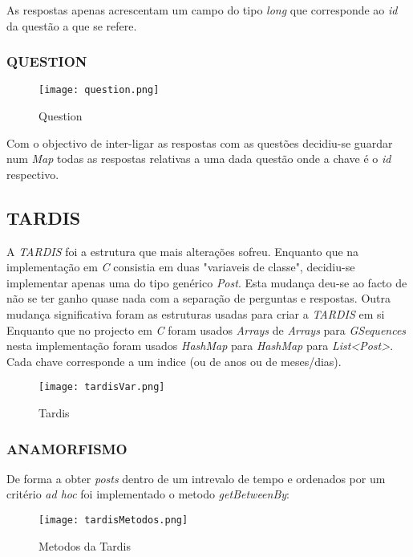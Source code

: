 \documentclass[letterpaper, 10 pt, conference]{IEEEtran} %
\begin{document}
As respostas apenas acrescentam um campo do tipo \textit{long} que corresponde ao \textit{id} da questão a que se refere.

\subsubsection{QUESTION}
\begin{figure}[h!]
  \centering
  \texttt{[image: question.png]}
   \caption{Question}
\end{figure}

Com o objectivo de inter-ligar as respostas com as questões decidiu-se guardar num \textit{Map} todas as respostas relativas a uma dada questão onde a chave é o \textit{id} respectivo.

\subsection{TARDIS}

A \textit{TARDIS} foi a estrutura que mais alterações sofreu.
Enquanto que na implementação em \textit{C} consistia em duas "variaveis de classe", decidiu-se implementar apenas uma do tipo genérico \textit{Post}. Esta mudança deu-se ao facto de não se ter ganho quase nada com a separação de perguntas e respostas.
Outra mudança significativa foram as estruturas usadas para criar a \textit{TARDIS} em si Enquanto que no projecto em \textit{C} foram usados \textit{Arrays} de \textit{Arrays} para \textit{GSequences} nesta implementação foram usados \textit{HashMap} para \textit{HashMap} para \textit{List<Post>}. Cada chave corresponde a um indice (ou de anos ou de meses/dias).

\begin{figure}[h!]
  \centering
  \texttt{[image: tardisVar.png]}
   \caption{Tardis}
\end{figure}

\subsubsection{ANAMORFISMO}

De forma a obter \textit{posts} dentro de um intrevalo de tempo e ordenados por um critério \textit{ad hoc}  foi implementado o metodo \textit{getBetweenBy}:

\begin{figure}[h!]
  \centering
  \texttt{[image: tardisMetodos.png]}
   \caption{Metodos da Tardis}
\end{figure}
\end{document}
